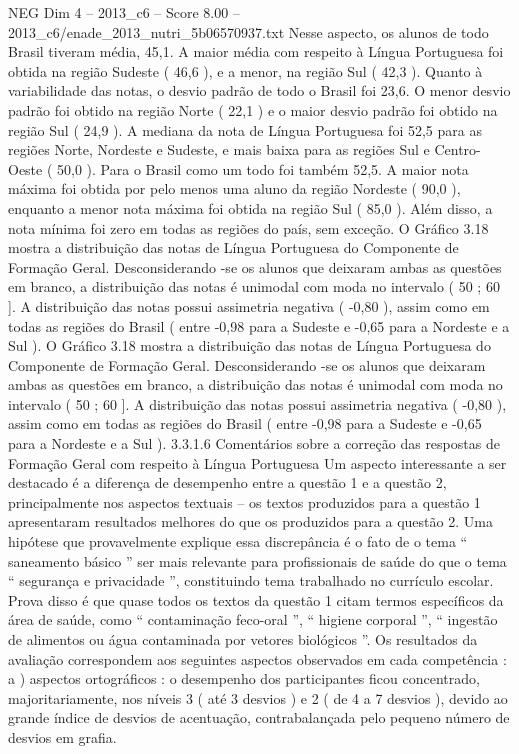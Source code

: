 \begin{textsample}{NEG Dim 4 – 2013\_c6 – Score 8.00 – 2013\_c6/enade\_2013\_nutri\_5b06570937.txt}
Nesse aspecto, os alunos de todo Brasil tiveram média, 45,1.
A maior média com respeito à Língua Portuguesa foi obtida na região Sudeste ( 46,6 ), e a menor, na região Sul ( 42,3 ).
Quanto à variabilidade das notas, o desvio padrão de todo o Brasil foi 23,6.
O menor desvio padrão foi obtido na região Norte ( 22,1 ) e o maior desvio padrão foi obtido na região Sul ( 24,9 ).
A mediana da nota de Língua Portuguesa foi 52,5 para as regiões Norte, Nordeste e Sudeste, e mais baixa para as regiões Sul e Centro-Oeste ( 50,0 ).
Para o Brasil como um todo foi também 52,5.
A maior nota máxima foi obtida por pelo menos uma aluno da região Nordeste ( 90,0 ), enquanto a menor nota máxima foi obtida na região Sul ( 85,0 ).
Além disso, a nota mínima foi zero em todas as regiões do país, sem exceção.
O Gráfico 3.18 mostra a distribuição das notas de Língua Portuguesa do Componente de Formação Geral.
Desconsiderando -se os alunos que deixaram ambas as questões em branco, a distribuição das notas é unimodal com moda no intervalo ( 50 ; 60 ].
A distribuição das notas possui assimetria negativa ( -0,80 ), assim como em todas as regiões do Brasil ( entre -0,98 para a Sudeste e -0,65 para a Nordeste e a Sul ).
O Gráfico 3.18 mostra a distribuição das notas de Língua Portuguesa do Componente de Formação Geral.
Desconsiderando -se os alunos que deixaram ambas as questões em branco, a distribuição das notas é unimodal com moda no intervalo ( 50 ; 60 ].
A distribuição das notas possui assimetria negativa ( -0,80 ), assim como em todas as regiões do Brasil ( entre -0,98 para a Sudeste e -0,65 para a Nordeste e a Sul ). 3.3.1.6 Comentários sobre a correção das respostas de Formação Geral com respeito à Língua Portuguesa Um aspecto interessante a ser destacado é a diferença de desempenho entre a questão 1 e a questão 2, principalmente nos aspectos textuais – os textos produzidos para a questão 1 apresentaram resultados melhores do que os produzidos para a questão 2.
Uma hipótese que provavelmente explique essa discrepância é o fato de o tema “ saneamento básico ” ser mais relevante para profissionais de saúde do que o tema “ segurança e privacidade ”, constituindo tema trabalhado no currículo escolar.
Prova disso é que quase todos os textos da questão 1 citam termos específicos da área de saúde, como “ contaminação feco-oral ”, “ higiene corporal ”, “ ingestão de alimentos ou água contaminada por vetores biológicos ”.
Os resultados da avaliação correspondem aos seguintes aspectos observados em cada competência : a ) aspectos ortográficos : o desempenho dos participantes ficou concentrado, majoritariamente, nos níveis 3 ( até 3 desvios ) e 2 ( de 4 a 7 desvios ), devido ao grande índice de desvios de acentuação, contrabalançada pelo pequeno número de desvios em grafia.

\end{textsample}
